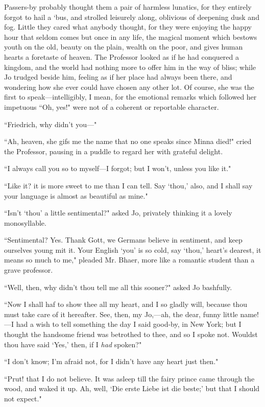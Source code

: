 Passers-by probably thought them a pair of harmless lunatics, for they
entirely forgot to hail a `bus, and strolled leisurely
along, oblivious of deepening dusk and fog. Little they cared what
anybody thought, for they were enjoying the happy hour that seldom comes
but once in any life, the magical moment which bestows youth on the old,
beauty on the plain, wealth on the poor, and gives human hearts a
foretaste of heaven. The Professor looked as if he had conquered a
kingdom, and the world had nothing more to offer him in the way of
bliss; while Jo trudged beside him, feeling as if her place had always
been there, and wondering how she ever could have chosen any other lot.
Of course, she was the first to speak---intelligibly, I mean, for the
emotional remarks which followed her impetuous ``Oh, yes!" were not of a
coherent or reportable character.

``Friedrich, why didn't you---"

``Ah, heaven, she gifs me the name that no one speaks since Minna died!"
cried the Professor, pausing in a puddle to regard her with grateful
delight.

``I always call you so to myself---I forgot; but I won't,
unless you like it."

``Like it? it is more sweet to me than I can tell. Say
`thou,' also, and I shall say your
language is almost as beautiful as mine."

``Isn't `thou' a little
sentimental?" asked Jo, privately thinking it a lovely monosyllable.

``Sentimental? Yes. Thank Gott, we Germans believe in sentiment, and keep
ourselves young mit it. Your English
`you' is so cold, say
`thou,' heart's
dearest, it means so much to me," pleaded Mr. Bhaer, more like a
romantic student than a grave professor.

``Well, then, why didn't thou tell me all this sooner?"
asked Jo bashfully.

``Now I shall haf to show thee all my heart, and I so gladly will,
because thou must take care of it hereafter. See, then, my Jo,---ah, the
dear, funny little name!---I had a wish to tell something the day I said
good-by, in New York; but I thought the handsome friend was betrothed to
thee, and so I spoke not. Wouldst thou have said
`Yes,' then, if I \emph{had} spoken?"

``I don't know; I'm afraid not, for I
didn't have any heart just then."

``Prut! that I do not believe. It was asleep till the fairy prince came
through the wood, and waked it up. Ah, well, `Die erste
Liebe ist die beste;' but that I should not expect."


